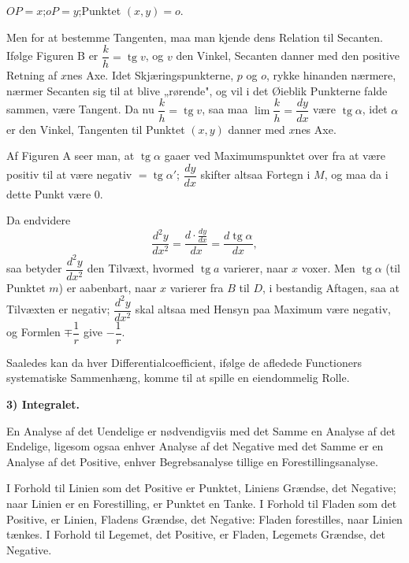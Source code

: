 \documentclass[12pt]{book}
\newcommand{\opage}[1]{\marginnote{\footnotesize\textit{[#1]}}}
\begin{document}
\begin{center}
$OP = x$;\quad $oP = y$;\quad Punktet $(x, y) = o$.
\end{center}

Men for at bestemme Tangenten, maa man kjende dens Relation til Secanten. Ifølge
Figuren B er $\dfrac{k}{h} = \operatorname{tg} v$, og $v$ den Vinkel, Secanten danner
med den positive Retning af $x$nes Axe. Idet Skjæringspunkterne, $p$ og $o$, rykke
hinanden nærmere, nærmer Secanten sig til at blive „rørende", og vil i det
\opage{65} Øieblik Punkterne falde sammen, være Tangent. Da nu
$\dfrac{k}{h} = \operatorname{tg} v$, saa maa $\lim\dfrac{k}{h} = \dfrac{dy}{dx}$
være $\operatorname{tg}\alpha$, idet $\alpha$ er den Vinkel, Tangenten til Punktet
$(x, y)$ danner med $x$nes Axe.

Af Figuren A seer man, at $\operatorname{tg}\alpha$ gaaer ved Maximumspunktet over
fra at være positiv til at være negativ $= \operatorname{tg}\alpha'$;
$\dfrac{dy}{dx}$ skifter altsaa Fortegn i $M$, og maa da i dette Punkt være 0.

Da endvidere
\[
\frac{d^{2}y}{dx^{2}} = \frac{d\cdot\frac{dy}{dx}}{dx}
= \frac{d\operatorname{tg}\alpha}{dx},
\]
saa betyder $\dfrac{d^{2}y}{dx^{2}}$ den Tilvæxt, hvormed $\operatorname{tg} a$ varierer, naar $x$ voxer. Men $\operatorname{tg}\alpha$ (til Punktet $m$) er
aabenbart, naar $x$ varierer fra $B$ til $D$, i bestandig Aftagen, saa at Tilvæxten
er negativ; $\dfrac{d^{2}y}{dx^{2}}$ skal altsaa med Hensyn paa Maximum være
negativ, og Formlen $\mp\dfrac{1}{r}$ give $-\dfrac{1}{r}$.

Saaledes kan da hver Differentialcoefficient, ifølge de afledede Functioners
systematiske Sammenhæng, komme til at spille en eiendommelig Rolle.

\begin{center}
\textbf{3) Integralet.}
\end{center}
{}

En Analyse af det Uendelige er nødvendigviis med det Samme en Analyse af det
Endelige, ligesom ogsaa enhver Analyse af det Negative med det Samme er en Analyse
af det Positive, enhver Begrebsanalyse tillige en Forestillingsanalyse.

I Forhold til Linien som det Positive er Punktet, Liniens Grændse, det Negative;
naar Linien er en Forestilling, er Punktet en Tanke. I Forhold til Fladen som det
Positive, er Linien, Fladens Grændse, det Negative: Fladen
\opage{66} forestilles, naar Linien tænkes. I Forhold til Legemet, det Positive, er Fladen,
Legemets Grændse, det Negative.
\end{document}
